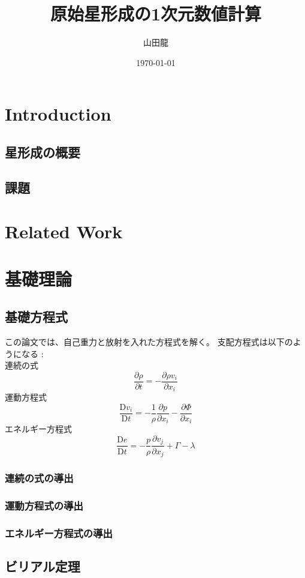 \documentclass{jsarticle}
\date{\today}
\author{山田龍}
\title{原始星形成の1次元数値計算}
\newcommand{\pder}[2][]{\frac{\partial#1}{\partial#2}}
\newcommand{\Dder}[2][]{\frac{\mathrm{D}#1}{\mathrm{D}#2}}
\begin{document}
\maketitle
\section{Introduction}
\subsection{星形成の概要}
\subsection{課題}
\section{Related Work}
\section{基礎理論}
\subsection{基礎方程式}
この論文では、自己重力と放射を入れた方程式を解く。
支配方程式は以下のようになる :\\
連続の式
\begin{equation}
    \pder[\rho]{t} = - \pder[\rho v_i]{x_i}    
\end{equation}
運動方程式
\begin{equation}
    \Dder[v_i]{t} = - \frac{1}{\rho}\pder[p]{x_i} - \pder[\Phi]{x_i}
\end{equation}
エネルギー方程式
\begin{equation}
    \Dder[e]{t} = - \frac{p}{\rho} \pder[v_j]{x_j} + \Gamma - \lambda
\end{equation}
\subsubsection{連続の式の導出}
\subsubsection{運動方程式の導出}
\subsubsection{エネルギー方程式の導出}
\subsection{ビリアル定理}
\end{document}
